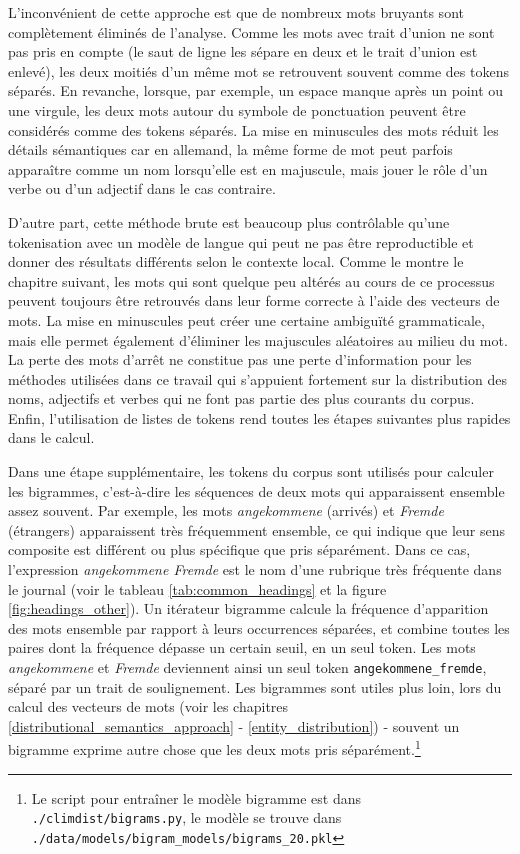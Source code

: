 \documentclass[a4paper,twoside,12pt]{article}
\begin{document}
L'inconvénient de cette approche est que de nombreux mots \og bruyants \fg{} sont complètement éliminés de l'analyse. Comme les mots avec trait d'union ne sont pas pris en compte  (le saut de ligne les sépare en deux et le trait d'union est enlevé), les deux moitiés d'un même mot se retrouvent souvent comme des tokens séparés. En revanche, lorsque, par exemple, un espace manque après un point ou une virgule, les deux mots autour du symbole de ponctuation peuvent être considérés comme des tokens séparés. La mise en minuscules des mots réduit les détails sémantiques car en allemand, la même forme de mot peut parfois apparaître comme un nom lorsqu'elle est en majuscule, mais jouer le rôle d'un verbe ou d'un adjectif dans le cas contraire.

D'autre part, cette méthode brute est beaucoup plus contrôlable qu'une tokenisation avec un modèle de langue qui peut ne pas être reproductible et donner des résultats différents selon le contexte local. Comme le montre le chapitre suivant, les mots qui sont quelque peu altérés au cours de ce processus peuvent toujours être retrouvés dans leur forme correcte à l'aide des vecteurs de mots. La mise en minuscules peut créer une certaine ambiguïté grammaticale, mais elle permet également d'éliminer les majuscules aléatoires au milieu du mot. La perte des mots d'arrêt ne constitue pas une perte d'information pour les méthodes utilisées dans ce travail qui s'appuient fortement sur la distribution des noms, adjectifs et verbes qui ne font pas partie des plus courants du corpus. Enfin, l'utilisation de listes de tokens rend toutes les étapes suivantes plus rapides dans le calcul.

Dans une étape supplémentaire, les tokens du corpus sont utilisés pour calculer les bigrammes, c'est-à-dire les séquences de deux mots qui apparaissent ensemble assez souvent. Par exemple, les mots \textit{angekommene} (arrivés) et \textit{Fremde} (étrangers) apparaissent très fréquemment ensemble, ce qui indique que leur sens composite est différent ou plus spécifique que pris séparément. Dans ce cas, l'expression \textit{angekommene Fremde} est le nom d'une rubrique très fréquente dans le journal (voir le tableau \ref{tab:common_headings} et la figure \ref{fig:headings_other}). Un itérateur bigramme calcule la fréquence d'apparition des mots ensemble par rapport à leurs occurrences séparées, et combine toutes les paires dont la fréquence dépasse un certain seuil, en un seul token. Les mots \textit{angekommene} et \textit{Fremde} deviennent ainsi un seul token \texttt{angekommene\_fremde}, séparé par un trait de soulignement. Les bigrammes sont utiles plus loin, lors du calcul des vecteurs de mots (voir les chapitres \ref{distributional_semantics_approach} - \ref{entity_distribution}) - souvent un bigramme exprime autre chose que les deux mots pris séparément.\footnote{Le script pour entraîner le modèle bigramme est dans \texttt{./climdist/bigrams.py}, le modèle se trouve dans \texttt{./data/models/bigram\_models/bigrams\_20.pkl}}
\end{document}
